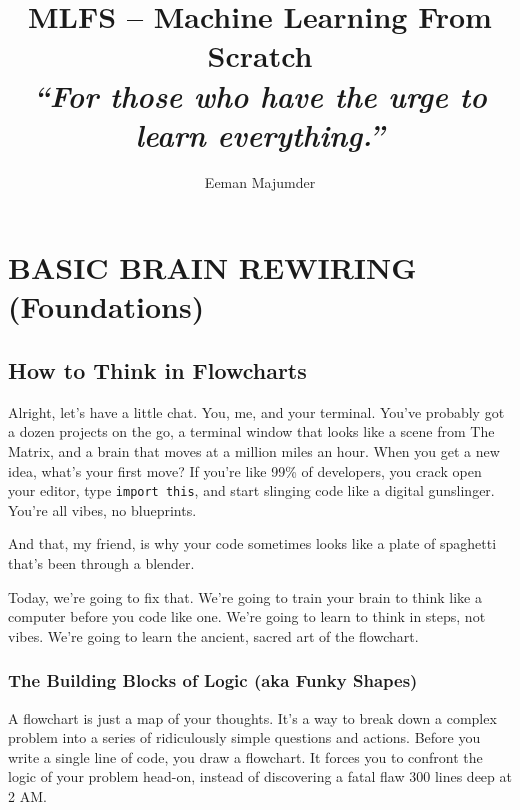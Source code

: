 \documentclass[11pt, letterpaper, openany]{book}
\begin{document}
\title{
    \Huge\bfseries MLFS – Machine Learning From Scratch \\
    \large\normalfont\textit{“For those who have the urge to learn everything.”}
}
\author{Eeman Majumder}
\date{}
\maketitle

\tableofcontents

\part{BASIC BRAIN REWIRING (Foundations)}

\chapter{How to Think in Flowcharts}

Alright, let's have a little chat. You, me, and your terminal. You've probably got a dozen projects on the go, a terminal window that looks like a scene from The Matrix, and a brain that moves at a million miles an hour. When you get a new idea, what's your first move? If you're like 99\% of developers, you crack open your editor, type \texttt{import this}, and start slinging code like a digital gunslinger. You're all vibes, no blueprints.

And that, my friend, is why your code sometimes looks like a plate of spaghetti that's been through a blender.

Today, we're going to fix that. We're going to train your brain to think like a computer before you code like one. We're going to learn to think in steps, not vibes. We're going to learn the ancient, sacred art of the flowchart.

\section{The Building Blocks of Logic (aka Funky Shapes)}

A flowchart is just a map of your thoughts. It's a way to break down a complex problem into a series of ridiculously simple questions and actions. Before you write a single line of code, you draw a flowchart. It forces you to confront the logic of your problem head-on, instead of discovering a fatal flaw 300 lines deep at 2 AM.
\end{document}
